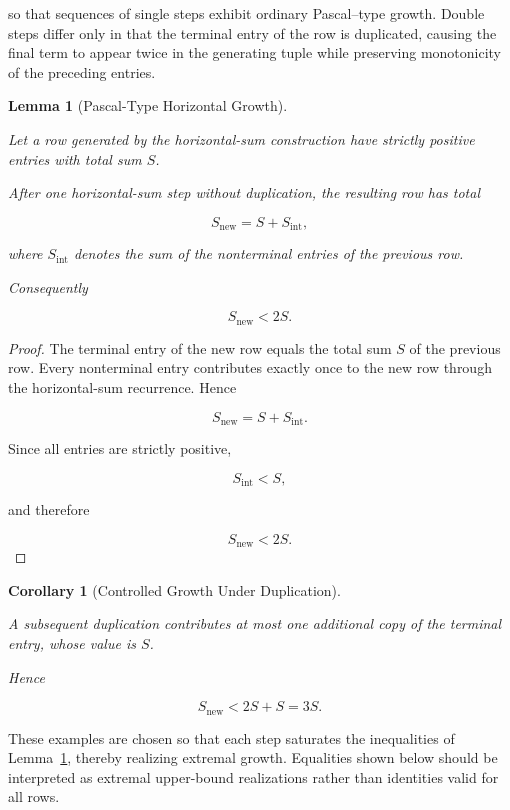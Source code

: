 \documentclass[12pt, oneside]{article}
\numberwithin{equation}{section}
\theoremstyle{definition}
\theoremstyle{plain}
\newtheorem{lemma}[theorem]{Lemma}
\newtheorem{corollary}[theorem]{Corollary}
\theoremstyle{remark}
\begin{document}
so that sequences of single steps exhibit ordinary Pascal--type growth.
Double steps differ only in that the terminal entry of the row is duplicated,
causing the final term to appear twice in the generating tuple while preserving
monotonicity of the preceding entries.

\begin{lemma}[Pascal-Type Horizontal Growth]
\label{lem:pascal-growth}

Let a row generated by the horizontal-sum construction have strictly positive entries
with total sum $S$.

After one horizontal-sum step without duplication, the resulting row has total

\[
S_{\mathrm{new}}
=
S+S_{\mathrm{int}},
\]

where $S_{\mathrm{int}}$ denotes the sum of the nonterminal entries of the
previous row.

Consequently

\[
S_{\mathrm{new}} < 2S.
\]

\end{lemma}

\begin{proof}

The terminal entry of the new row equals the total sum $S$ of the previous row.
Every nonterminal entry contributes exactly once to the new row through the
horizontal-sum recurrence. Hence

\[
S_{\mathrm{new}}
=
S+S_{\mathrm{int}}.
\]

Since all entries are strictly positive,

\[
S_{\mathrm{int}}<S,
\]

and therefore

\[
S_{\mathrm{new}}<2S.
\]

\end{proof}

\begin{corollary}[Controlled Growth Under Duplication]
\label{lem:controlled-growth-under-duplication}

A subsequent duplication contributes at most one additional copy of the
terminal entry, whose value is $S$.

Hence

\[
S_{\mathrm{new}}
<
2S+S
=
3S.
\]

\end{corollary}

These examples are chosen so that each step saturates the inequalities of
Lemma~\ref{lem:pascal-growth}, thereby realizing extremal growth. Equalities
shown below should be interpreted as extremal upper-bound realizations rather than
identities valid for all rows.
\end{document}
